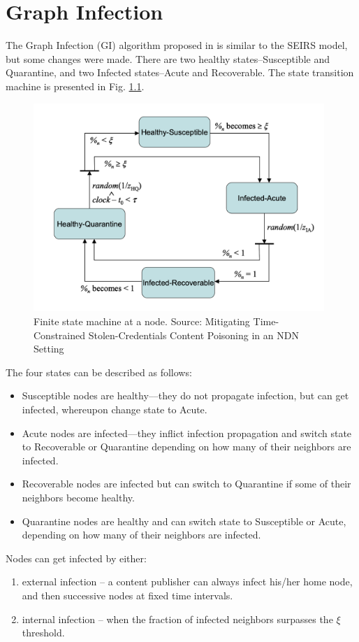 \chapter{Graph Infection}
\label{graph-infection}
The Graph Infection (GI) algorithm proposed in \cite{konorski2019mitigating} is similar to the SEIRS model, but some changes were made. There are two  healthy states--Susceptible and Quarantine, and two Infected states--Acute and Recoverable. The state transition machine is presented in Fig. \ref{fig:finite-state-machine-jekon}.
\begin{figure}[h!]
    \includegraphics[width=11cm]{img/finite-state-at-node.png}
    \centering
    \caption{Finite state machine at a node. Source: Mitigating Time-Constrained Stolen-Credentials Content Poisoning in an NDN Setting \cite{konorski2019mitigating}}
    \label{fig:finite-state-machine-jekon}
\end{figure} 

The four states can be described as follows:
\begin{itemize}
\item Susceptible nodes are healthy––they do not propagate infection, but can get infected, whereupon change state to Acute.
\item Acute nodes are infected––they inflict infection propagation and switch state to Recoverable or Quarantine depending on how many of their neighbors are infected.
\item Recoverable nodes are infected but can switch to Quarantine if some of their neighbors become healthy.
\item Quarantine nodes are healthy and can switch state to Susceptible or Acute, depending on how many of their neighbors are infected.
\end{itemize}
Nodes can get infected by either:
\begin{enumerate}
    \item external infection -- a content publisher can always infect his/her home node, and then successive nodes at fixed time intervals.
    \item internal infection -- when the fraction of infected neighbors surpasses the $\xi$ threshold. 
\end{enumerate}

